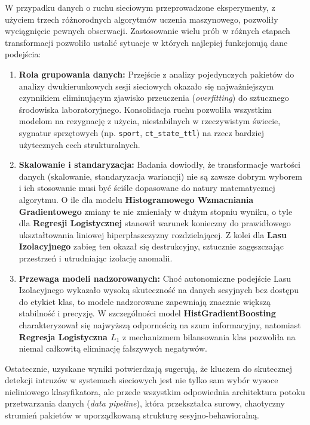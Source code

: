 \documentclass[12pt,twoside]{article}
\begin{document}
W przypadku danych o ruchu sieciowym przeprowadzone eksperymenty, z użyciem trzech różnorodnych algorytmów uczenia maszynowego, pozwoliły wyciągnięcie pewnych obserwacji.
Zastosowanie wielu prób w różnych etapach transformacji pozwoliło ustalić sytuacje w których najlepiej funkcjonują dane podejścia:

\begin{enumerate}
    \item \textbf{Rola grupowania danych:} Przejście z analizy pojedynczych pakietów do analizy dwukierunkowych sesji sieciowych okazało się najważniejszym czynnikiem eliminującym zjawisko przeuczenia (\emph{overfitting}) do sztucznego środowiska laboratoryjnego.
    Konsolidacja ruchu pozwoliła wszystkim modelom na rezygnację z użycia, niestabilnych w rzeczywistym świecie, sygnatur sprzętowych (np. \texttt{sport}, \texttt{ct\_state\_ttl}) na rzecz bardziej użytecznych cech strukturalnych.
    \item \textbf{Skalowanie i standaryzacja:} Badania dowiodły, że transformacje wartości danych (skalowanie, standaryzacja wariancji) nie są zawsze dobrym wyborem i ich stosowanie musi być ściśle dopasowane do natury matematycznej algorytmu. 
    O ile dla modelu \textbf{Histogramowego Wzmacniania Gradientowego} zmiany te nie zmieniały w dużym stopniu wyniku, o tyle dla \textbf{Regresji Logistycznej} stanowił warunek konieczny do prawidłowego ukształtowania liniowej hiperpłaszczyzny rozdzielającej. 
    Z kolei dla \textbf{Lasu Izolacyjnego} zabieg ten okazał się destrukcyjny, sztucznie zagęszczając przestrzeń i utrudniając izolację anomalii.
    \item \textbf{Przewaga modeli nadzorowanych:} Choć autonomiczne podejście Lasu Izolacyjnego wykazało wysoką skuteczność na danych sesyjnych bez dostępu do etykiet klas, to modele nadzorowane zapewniają znacznie większą stabilność i precyzję. 
    W szczególności model \textbf{HistGradientBoosting} charakteryzował się najwyższą odpornością na szum informacyjny, natomiast \textbf{Regresja Logistyczna $L_1$} z mechanizmem bilansowania klas pozwoliła na niemal całkowitą eliminację fałszywych negatywów.
\end{enumerate}

Ostatecznie, uzyskane wyniki potwierdzają sugerują, że kluczem do skutecznej detekcji intruzów w systemach sieciowych jest nie tylko sam wybór wysoce nieliniowego klasyfikatora, ale przede wszystkim odpowiednia architektura potoku przetwarzania danych (\emph{data pipeline}), która przekształca surowy, chaotyczny strumień pakietów w uporządkowaną strukturę sesyjno-behawioralną.
\end{document}
